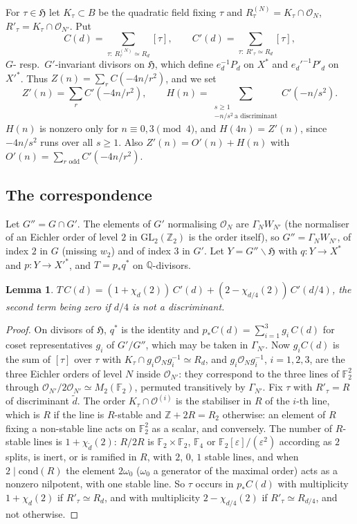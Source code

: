 \documentclass[11pt,reqno]{amsart}
\theoremstyle{plain}
\newtheorem{lemma}[theorem]{Lemma}
\theoremstyle{definition}
\newcommand{\Q}{\mathbb{Q}}
\newcommand{\Z}{\mathbb{Z}}
\newcommand{\F}{\mathbb{F}}
\newcommand{\HH}{\mathfrak{H}}
\newcommand{\cO}{\mathcal{O}}
\begin{document}
For $\tau\in\HH$ let $K_\tau\subset B$ be the quadratic field fixing $\tau$ and $R^{(N)}_\tau=K_\tau\cap\cO_N$,
$R'_\tau=K_\tau\cap\cO_{N'}$. Put
\[
C(d)=\sum_{\tau:\ R^{(N)}_\tau\simeq R_d}[\tau],\qquad C'(d)=\sum_{\tau:\ R'_\tau\simeq R_d}[\tau],
\]
$G$- resp.\ $G'$-invariant divisors on $\HH$, which define $e_d^{-1}P_d$ on $X^*$ and
$e_d'^{-1}P'_d$ on $X'^*$. Thus $Z(n)=\sum_rC(-4n/r^2)$, and we set
\[
Z'(n)=\sum_{r}C'(-4n/r^2),\qquad H(n)=\sum_{\substack{s\ge1\\ -n/s^2\ \text{a discriminant}}}C'(-n/s^2).
\]
$H(n)$ is nonzero only for $n\equiv0,3\pmod4$, and $H(4n)=Z'(n)$, since $-4n/s^2$ runs over all
$s\ge1$. Also $Z'(n)=O'(n)+H(n)$ with $O'(n)=\sum_{r\text{ odd}}C'(-4n/r^2)$.

\subsection{The correspondence}
Let $G''=G\cap G'$. The elements of $G'$ normalising $\cO_N$ are $\Gamma_NW_{N'}$ (the normaliser
of an Eichler order of level $2$ in $\mathrm{GL}_2(\Z_2)$ is the order itself), so
$G''=\Gamma_NW_{N'}$, of index $2$ in $G$ (missing $w_2$) and of index $3$ in $G'$. Let
$Y=G''\backslash\HH$ with $q:Y\to X^*$ and $p:Y\to X'^*$, and $T=p_*q^*$ on $\Q$-divisors.

\begin{lemma}\label{lem:fibre}
$T\,C(d)=(1+\chi_d(2))\,C'(d)+(2-\chi_{d/4}(2))\,C'(d/4)$, the second term being zero if $d/4$ is
not a discriminant.
\end{lemma}

\begin{proof}
On divisors of $\HH$, $q^*$ is the identity and $p_*C(d)=\sum_{i=1}^3g_i\,C(d)$ for coset
representatives $g_i$ of $G'/G''$, which may be taken in $\Gamma_{N'}$. Now $g_iC(d)$ is the sum of
$[\tau]$ over $\tau$ with $K_\tau\cap g_i\cO_Ng_i^{-1}\simeq R_d$, and $g_i\cO_Ng_i^{-1}$, $i=1,2,3$,
are the three Eichler orders of level $N$ inside $\cO_{N'}$: they correspond to the three lines of
$\F_2^2$ through $\cO_{N'}/2\cO_{N'}\simeq M_2(\F_2)$, permuted transitively by $\Gamma_{N'}$. Fix
$\tau$ with $R'_\tau=R$ of discriminant $\tilde d$. The order $K_\tau\cap\cO^{(i)}$ is the
stabiliser in $R$ of the $i$-th line, which is $R$ if the line is $R$-stable and $\Z+2R=R_2$
otherwise: an element of $R$ fixing a non-stable line acts on $\F_2^2$ as a scalar, and conversely.
The number of $R$-stable lines is $1+\chi_{\tilde d}(2)$: $R/2R$ is $\F_2\times\F_2$, $\F_4$ or
$\F_2[\varepsilon]/(\varepsilon^2)$ according as $2$ splits, is inert, or is ramified in $R$, with
$2$, $0$, $1$ stable lines, and when $2\mid\text{cond}(R)$ the element $2\omega_0$ ($\omega_0$ a
generator of the maximal order) acts as a nonzero nilpotent, with one stable line. So $\tau$ occurs
in $p_*C(d)$ with multiplicity $1+\chi_d(2)$ if $R'_\tau\simeq R_d$, and with multiplicity
$2-\chi_{d/4}(2)$ if $R'_\tau\simeq R_{d/4}$, and not otherwise.
\end{proof}
\end{document}
